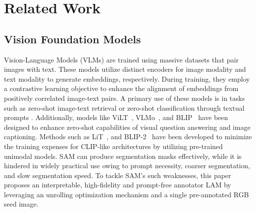 \section{Related Work}
\vspace{-0.1cm}
\label{related_work}
\subsection{Vision Foundation Models}
Vision-Language Models (VLMs) \cite{ALIGN} are trained using massive datasets that pair images with text. These models utilize distinct encoders for image modality and text modality to generate embeddings, respectively. During training, they employ a contrastive learning objective to enhance the alignment of embeddings from positively correlated image-text pairs. A primary use of these models is in tasks such as zero-shot image-text retrieval or zero-shot classification through textual prompts \cite{CLIP}. Additionally, models like ViLT~\cite{VILT}, VLMo~\cite{VLMO}, and BLIP~\cite{BLIP} have been designed to enhance zero-shot capabilities of visual question answering and image captioning. Methods such as LiT~\cite{LIT}, and BLIP-2~\cite{BLIP2} have been developed to minimize the training expenses for CLIP-like architectures by utilizing pre-trained unimodal models. SAM \cite{segment-anything} can produce segmentation masks effectively, while it is hindered in widely practical use owing to prompt necessity, coarser segmentation, and slow segmentation speed. To tackle SAM's such weaknesses, this paper proposes an interpretable, high-fidelity and prompt-free annotator LAM by leveraging an unrolling optimization mechanism and a single pre-annotated RGB seed image. 

